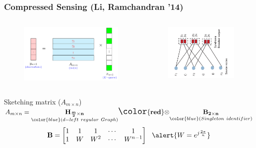 \begin{frame} \frametitle{Compressed Sensing (Li, Ramchandran '14)}
\vspace*{-0.5in}
    \begin{columns}
    \begin{figure}[t]
    \centering
    \includegraphics[width=2.5in]{./Figures/A_times_X_CS.pdf}
    \end{figure}
        \begin{figure}[t]
        \centering
        \includegraphics[width=1.75in,angle=-90]{./Figures/syndromesourcecoding2_2}
        \end{figure}
    \end{columns}

			\begin{block}{Sketching matrix ($A_{m\times n}$)}
				\centering
				$A_{m \times n}  = \underset{\color{blue} (d-left \ regular \ Graph)}{\bf H_{\frac{m}{2} \times n}} {\Large \bf \color{red} \otimes} \underset{\color{blue} (Singleton \ identifier)}{\bf B_{2 \times n}}$ \\
				
				\[ {\bf B} = \begin{bmatrix}
				1 & 1 & 1 & \cdots & 1\\
				1 & W & W^2 & \cdots & W^{n-1}
				\end{bmatrix} \ \  \alert{W = e^{j \frac{2\pi}{n}}} \]	
			\end{block}
\end{frame}

